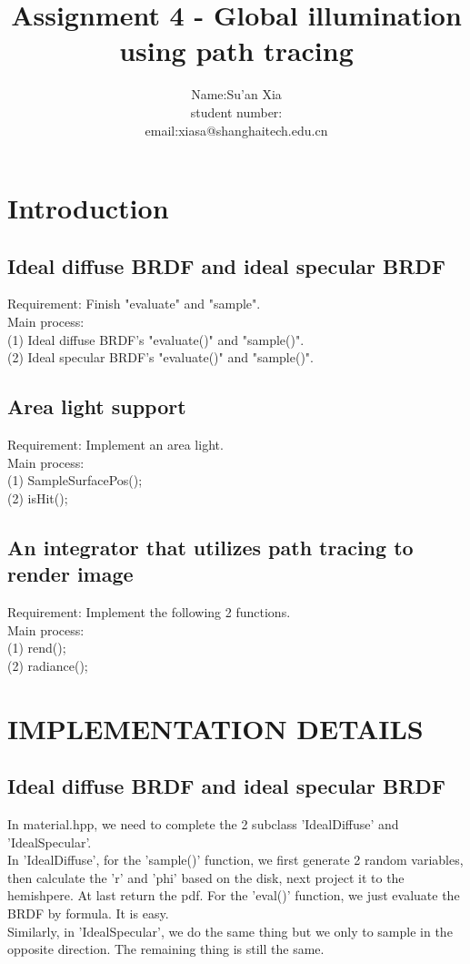 \documentclass[acmtog]{acmart}
\title{Assignment 4 - Global illumination using path tracing}
\author{Name:\quad Su'an Xia  \\ student number:\quad 18047482
	\\email:\quad xiasa@shanghaitech.edu.cn}
\begin{document}
\maketitle

\vspace*{2 ex}


\section{Introduction}
\subsection{Ideal diffuse BRDF and ideal specular BRDF}
Requirement: Finish "evaluate" and "sample".
\\Main process: 
\\(1) Ideal diffuse BRDF's "evaluate()" and "sample()".
\\(2) Ideal specular BRDF's "evaluate()" and "sample()".

\vspace*{1 ex}
\subsection{Area light support}
Requirement: Implement an area light.
\\Main process:
\\(1) SampleSurfacePos();
\\(2) isHit();

\vspace*{1 ex}
\subsection{An integrator that utilizes path tracing to render image}
Requirement: Implement the following 2 functions.
\\Main process:
\\(1) rend();
\\(2) radiance();

\vspace*{2 ex}
\section{IMPLEMENTATION DETAILS}
\subsection{Ideal diffuse BRDF and ideal specular BRDF}
In material.hpp, we need to complete the 2 subclass 'IdealDiffuse' and   'IdealSpecular'.
\\In 'IdealDiffuse', for the 'sample()' function, we first generate 2 random variables, then calculate the  'r' and 'phi' based on the disk, next project it to the hemishpere. At last return the pdf. For the 'eval()' function, we just evaluate the BRDF by formula. It is easy.
\\Similarly, in 'IdealSpecular', we do the same thing but we only to sample in the opposite direction. The remaining thing is still the same.
\end{document}
